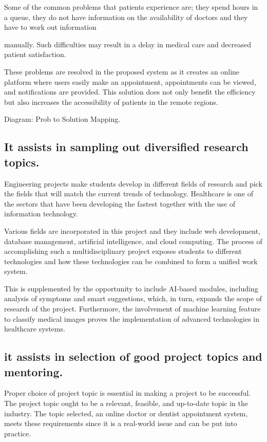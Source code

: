 Some of the common problems that patients experience are; they spend hours in a queue, they do not have information on the availability of doctors and they have to work out information

manually. Such difficulties may result in a delay in medical care and decreased patient satisfaction.

These problems are resolved in the proposed system as it creates an online platform where users easily make an appointment, appointments can be viewed, and notifications are provided. This solution does not only benefit the efficiency but also increases the accessibility of patients in the remote regions.

Diagram: Prob to Solution Mapping.

\subsection{It assists in sampling out diversified research topics.}

Engineering projects make students develop in different fields of research and pick the fields that will match the current trends of technology. Healthcare is one of the sectors that have been developing the fastest together with the use of information technology.

Various fields are incorporated in this project and they include web development, database management, artificial intelligence, and cloud computing. The process of accomplishing such a multidisciplinary project exposes students to different technologies and how these technologies can be combined to form a unified work system.

This is supplemented by the opportunity to include AI-based modules, including analysis of symptoms and smart suggestions, which, in turn, expands the scope of research of the project. Furthermore, the involvement of machine learning feature to classify medical images proves the implementation of advanced technologies in healthcare systems.

\subsection{it assists in selection of good project topics and mentoring.}

Proper choice of project topic is essential in making a project to be successful. The project topic ought to be a relevant, feasible, and up-to-date topic in the industry. The topic selected, an online doctor or dentist appointment system, meets these requirements since it is a real-world issue and can be put into practice.

